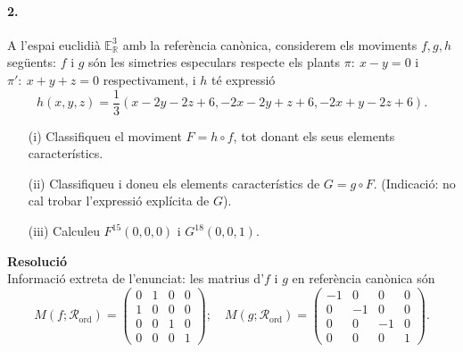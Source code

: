 \documentclass[10pt]{article}
\newcommand{\euc}[1]{\mathbb{E}_{\mathbb{R}}^{#1}}
\begin{document}
\paragraph{2.} A l'espai euclidià $\euc{3}$ amb la referència canònica, considerem els moviments $f,g,h$ següents: $f$ i $g$ són les simetries especulars respecte els plants $\pi:\ x-y=0$ i $\pi':\ x+y+z=0$ respectivament, i $h$ té expressió
\[
h(x,y,z)=\dfrac{1}{3}(x-2y-2z+6,-2x-2y+z+6,-2x+y-2z+6).
\]
\begin{itemize}
	\item[(i)] Classifiqueu el moviment $F=h\circ f$, tot donant els seus elements característics.
	\item[(ii)] Classifiqueu i doneu els elements característics de $G=g\circ F$. (Indicació: no cal trobar l'expressió explícita de $G$).
	\item[(iii)] Calculeu $F^{15}(0,0,0)$ i $G^{18}(0,0,1)$.
\end{itemize}
\textbf{Resolució}\\
Informació extreta de l'enunciat: les matrius d'$f$ i $g$ en referència canònica són
	\[
	M(f;\mathcal{R}_{\text{ord}})=\begin{pmatrix}
	0 & 1 & 0 & 0\\
	1 & 0 & 0 & 0\\
	0 & 0 & 1 & 0\\
	0 & 0 & 0 & 1
	\end{pmatrix};\quad M(g;\mathcal{R}_{\text{ord}})=\begin{pmatrix}
	-1 & 0 & 0 & 0\\
	0 & -1 & 0 & 0\\
	0 & 0 & -1 & 0\\
	0 & 0 & 0 & 1
	\end{pmatrix}.
	\]
\end{document}
